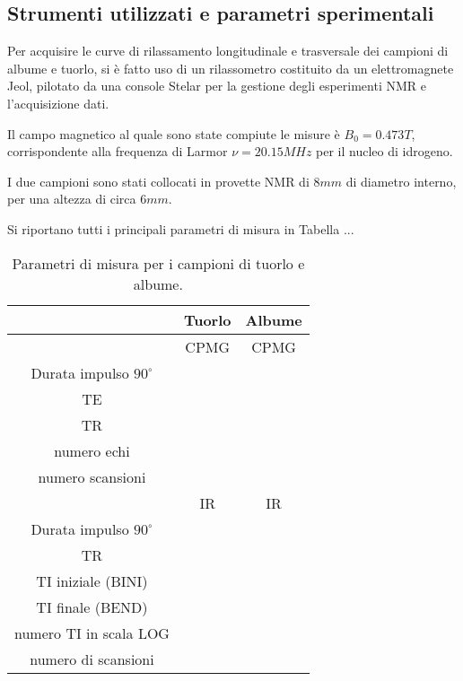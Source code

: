 \subsection*{Strumenti utilizzati e parametri sperimentali}

Per acquisire le curve di rilassamento longitudinale e trasversale dei campioni di albume e tuorlo, si è fatto uso di un rilassometro costituito da un elettromagnete Jeol, pilotato da una console Stelar per la gestione degli esperimenti NMR e l'acquisizione dati.

Il campo magnetico al quale sono state compiute le misure è $B_0 = 0.473\si{T}$, corrispondente alla frequenza di Larmor $\nu = 20.15\si{MHz}$ per il nucleo di idrogeno.

I due campioni sono stati collocati in provette NMR di $8\si{mm}$ di diametro interno, per una altezza di circa $6\si{mm}$.

Si riportano tutti i principali parametri di misura in Tabella ...

\begin{table}
	\centering
	\begin{tabular}{cc|c}
	\toprule
		& \textbf{Tuorlo}	& \textbf{Albume}	\\
	\midrule
		& CPMG 				& CPMG 				\\
	Durata impulso $90^{\circ}$ & & \\
	TE & & \\
	TR & & \\
	numero echi & & \\
	numero scansioni & & \\
	\midrule
	\midrule
		& IR				& IR				\\
	Durata impulso $90^{\circ}$ & & \\
	TR & & \\
	TI iniziale (BINI) & & \\
	TI finale (BEND) & & \\
	numero TI in scala LOG & & \\
	numero di scansioni & & \\
	\bottomrule
	\end{tabular}
	\label{tab:setup}
	\caption{Parametri di misura per i campioni di tuorlo e albume.}
\end{table}